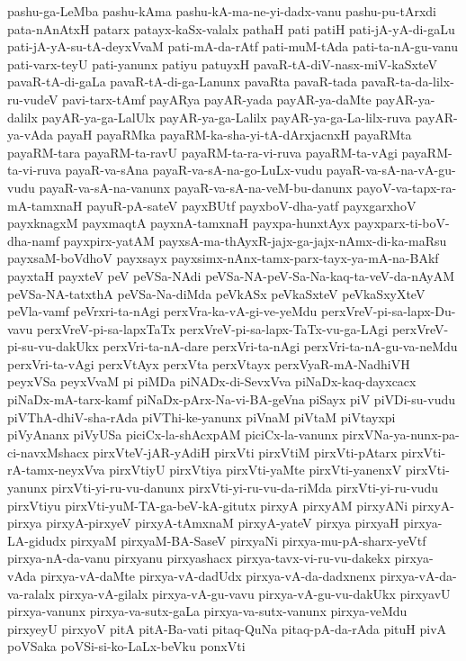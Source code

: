 {pashu-ga-LeMba
pashu-kAma
pashu-kA-ma-ne-yi-dadx-vanu
pashu-pu-tArxdi
pata-nAnAtxH
patarx
patayx-kaSx-valalx
pathaH
pati
patiH
pati-jA-yA-di-gaLu
pati-jA-yA-su-tA-deyxVvaM
pati-mA-da-rAtf
pati-muM-tAda
pati-ta-nA-gu-vanu
pati-varx-teyU
pati-yanunx
patiyu
patuyxH
pavaR-tA-diV-nasx-miV-kaSxteV
pavaR-tA-di-gaLa
pavaR-tA-di-ga-Lanunx
pavaRta
pavaR-tada
pavaR-ta-da-lilx-ru-vudeV
pavi-tarx-tAmf
payARya
payAR-yada
payAR-ya-daMte
payAR-ya-dalilx
payAR-ya-ga-LalUlx
payAR-ya-ga-Lalilx
payAR-ya-ga-La-lilx-ruva
payAR-ya-vAda
payaH
payaRMka
payaRM-ka-sha-yi-tA-dArxjacnxH
payaRMta
payaRM-tara
payaRM-ta-ravU
payaRM-ta-ra-vi-ruva
payaRM-ta-vAgi
payaRM-ta-vi-ruva
payaR-va-sAna
payaR-va-sA-na-go-LuLx-vudu
payaR-va-sA-na-vA-gu-vudu
payaR-va-sA-na-vanunx
payaR-va-sA-na-veM-bu-danunx
payoV-va-tapx-ra-mA-tamxnaH
payuR-pA-sateV
payxBUtf
payxboV-dha-yatf
payxgarxhoV
payxknagxM
payxmaqtA
payxnA-tamxnaH
payxpa-hunxtAyx
payxparx-ti-boV-dha-namf
payxpirx-yatAM
payxsA-ma-thAyxR-jajx-ga-jajx-nAmx-di-ka-maRsu
payxsaM-boVdhoV
payxsayx
payxsimx-nAnx-tamx-parx-tayx-ya-mA-na-BAkf
payxtaH
payxteV
peV
peVSa-NAdi
peVSa-NA-peV-Sa-Na-kaq-ta-veV-da-nAyAM
peVSa-NA-tatxthA
peVSa-Na-diMda
peVkASx
peVkaSxteV
peVkaSxyXteV
peVla-vamf
peVrxri-ta-nAgi
perxVra-ka-vA-gi-ve-yeMdu
perxVreV-pi-sa-lapx-Du-vavu
perxVreV-pi-sa-lapxTaTx
perxVreV-pi-sa-lapx-TaTx-vu-ga-LAgi
perxVreV-pi-su-vu-dakUkx
perxVri-ta-nA-dare
perxVri-ta-nAgi
perxVri-ta-nA-gu-va-neMdu
perxVri-ta-vAgi
perxVtAyx
perxVta
perxVtayx
perxVyaR-mA-NadhiVH
peyxVSa
peyxVvaM
pi
piMDa
piNADx-di-SevxVva
piNaDx-kaq-dayxcacx
piNaDx-mA-tarx-kamf
piNaDx-pArx-Na-vi-BA-geVna
piSayx
piV
piVDi-su-vudu
piVThA-dhiV-sha-rAda
piVThi-ke-yanunx
piVnaM
piVtaM
piVtayxpi
piVyAnanx
piVyUSa
piciCx-la-shAcxpAM
piciCx-la-vanunx
pirxVNa-ya-nunx-pa-ci-navxMshacx
pirxVteV-jAR-yAdiH
pirxVti
pirxVtiM
pirxVti-pAtarx
pirxVti-rA-tamx-neyxVva
pirxVtiyU
pirxVtiya
pirxVti-yaMte
pirxVti-yanenxV
pirxVti-yanunx
pirxVti-yi-ru-vu-danunx
pirxVti-yi-ru-vu-da-riMda
pirxVti-yi-ru-vudu
pirxVtiyu
pirxVti-yuM-TA-ga-beV-kA-gitutx
pirxyA
pirxyAM
pirxyANi
pirxyA-pirxya
pirxyA-pirxyeV
pirxyA-tAmxnaM
pirxyA-yateV
pirxya
pirxyaH
pirxya-LA-gidudx
pirxyaM
pirxyaM-BA-SaseV
pirxyaNi
pirxya-mu-pA-sharx-yeVtf
pirxya-nA-da-vanu
pirxyanu
pirxyashacx
pirxya-tavx-vi-ru-vu-dakekx
pirxya-vAda
pirxya-vA-daMte
pirxya-vA-dadUdx
pirxya-vA-da-dadxnenx
pirxya-vA-da-va-ralalx
pirxya-vA-gilalx
pirxya-vA-gu-vavu
pirxya-vA-gu-vu-dakUkx
pirxyavU
pirxya-vanunx
pirxya-va-sutx-gaLa
pirxya-va-sutx-vanunx
pirxya-veMdu
pirxyeyU
pirxyoV
pitA
pitA-Ba-vati
pitaq-QuNa
pitaq-pA-da-rAda
pituH
pivA
poVSaka
poVSi-si-ko-LaLx-beVku
ponxVti
}
